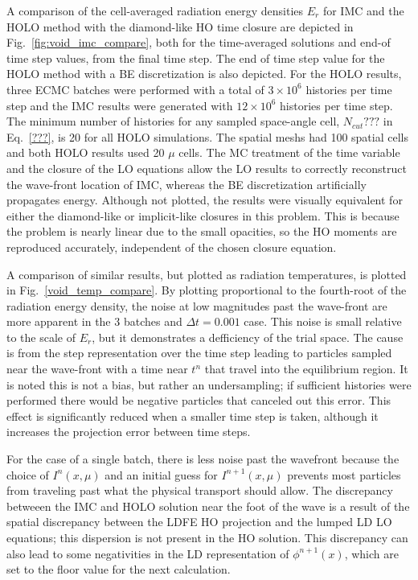 A comparison of the cell-averaged radiation energy densities $E_r$ for IMC and the HOLO
method with the diamond-like HO time closure are depicted in Fig.~\ref{fig:void_imc_compare},
both for the time-averaged solutions and end-of time step values, from the final time
step.  The end of time step value for the HOLO method with a BE discretization is also depicted.
For the HOLO results, three ECMC batches were performed with
a total of $3\times10^6$ histories per time step and the IMC results were generated with
$12\times10^6$ histories per time step. 
The minimum number of histories for any sampled space-angle cell, $N_{cut}???$ in
 Eq.~\eqref{???}, is 20 for all HOLO simulations.
The spatial meshs had 100 spatial cells and both
HOLO results used 20 $\mu$ cells.  
The MC treatment of the time
variable and the closure of the LO equations allow the LO results to correctly reconstruct
the wave-front location of IMC, whereas the BE discretization artificially propagates
energy.   Although not plotted, the results were visually equivalent for either the diamond-like or implicit-like
closures in this problem.  This is because the problem is nearly linear due to the small
opacities, so the HO moments are reproduced accurately, independent of the chosen closure
equation.

A comparison of similar results, but plotted as radiation temperatures, is plotted in
Fig.~\ref{void_temp_compare}.  By plotting
proportional to the fourth-root of the radiation energy density, the noise at low
magnitudes past the wave-front are more apparent in the 3 batches and $\Delta t = 0.001$
case.  This
noise is small relative to the scale of $E_r$, but it demonstrates a defficiency of
the trial space.  The cause is from the step representation over the time step leading to
particles sampled near the wave-front with a time near $t^{n}$ that travel into the
equilibrium region.  It is noted this is not a bias, but rather an undersampling; if
sufficient histories were performed there would be negative particles that canceled out this
error.  This effect is significantly reduced when a smaller time step is taken, although
it increases the projection error between time steps. 

For the case of a single batch, 
there is less noise past the wavefront because the
choice of $I^{n}(x,\mu)$ and an initial guess for $I^{n+1}(x,\mu)$ prevents most particles from
traveling past what the physical transport should allow.  The discrepancy betweeen the IMC
and HOLO solution near the foot of
the wave is a result of the spatial discrepancy between the LDFE HO projection and the
lumped LD LO equations; this dispersion is not present in the HO solution.  This
discrepancy can also lead to some negativities in the LD representation of
$\phi^{n+1}(x)$, which are set to the floor value for the next calculation. 


